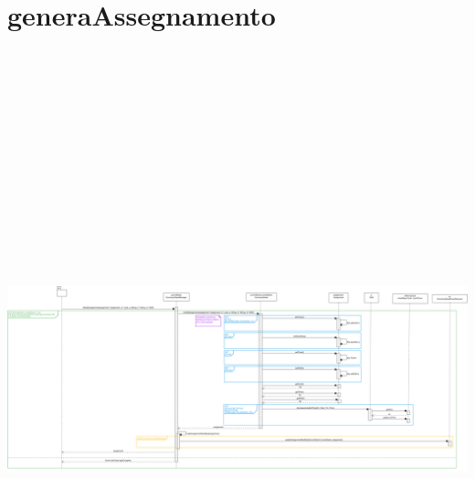 \section{generaAssegnamento}
\centering\includegraphics[max width=\textwidth, max height=190mm]{../resources/img/GCC/DSD/op5.png}

